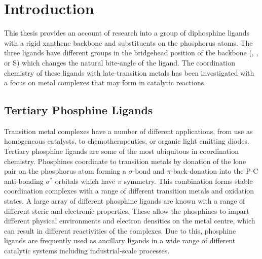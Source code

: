 
\chapter{Introduction}
\label{chapter:introduction}

This thesis provides an account of research into a group of diphosphine ligands with a rigid xanthene backbone and \tBu{} substituents on the phosphorus atoms.  The three ligands have different groups in the bridgehead position of the backbone (, , or S) which changes the natural bite-angle of the ligand.  The coordination chemistry of these \tBuxantphos{} ligands with late-transition metals has been investigated with a focus on metal complexes that may form in catalytic reactions.




\section{Tertiary Phosphine Ligands}

Transition metal complexes have a number of different applications, from use as homogeneous catalysts, to chemotherapeutics, or organic light emitting diodes.\cite{Lamansky2001, Rosenberg1969, Wilson2013}  Tertiary phosphine ligands are some of the most ubiquitous in coordination chemistry.  Phosphines coordinate to transition metals by donation of the lone pair on the phosphorus atom forming a $\sigma$-bond and $\pi$-back-donation into the P-C anti-bonding $\sigma^*$ orbitals which have $\pi$ symmetry.\cite{Orpen1990}  This combination forms stable coordination complexes with a range of different transition metals and oxidation states.  A large array of different phosphine ligands are known with a range of different steric and electronic properties.  These allow the phosphines to impart different physical environments and electron densities on the metal centre, which can result in different reactivities of the complexes.  Due to this, phosphine ligands are frequently used as ancillary ligands in a wide range of different catalytic systems including industrial-scale processes.\cite{Noyori2002, Nicolaou2005, Knowles2002}


